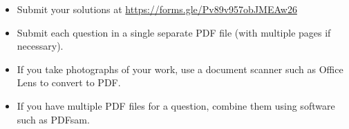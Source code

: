 \documentclass{article}
\begin{document}
\vfill
\small
\begin{itemize}
	\item Submit your solutions at \href{https://forms.gle/Pv89v957obJMEAw26}{https://forms.gle/Pv89v957obJMEAw26}
	\item Submit each question in a single separate PDF file (with multiple pages if necessary).
	\item If you take photographs of your work, use a document scanner such as Office Lens to convert to PDF.
	\item If you have multiple PDF files for a question, combine them using software such as PDFsam.
\end{itemize}

\end{document}
